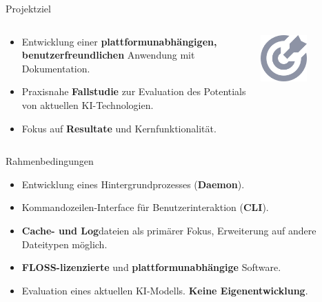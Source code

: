 \documentclass[
    ngerman,%
    authorontitle=true,
]{bfhbeamer}
\begin{document}
    \begin{frame}{Projektziel}
        \begin{columns}
            \begin{column}{0.7\textwidth}
                \begin{itemize}
                    \item Entwicklung einer \textbf{plattformunabh\"angigen, benutzerfreundlichen} Anwendung mit Dokumentation.
                    \item Praxisnahe \textbf{Fallstudie} zur Evaluation des Potentials von aktuellen KI-Technologien.
                    \item Fokus auf \textbf{Resultate} und Kernfunktionalit\"at.
                \end{itemize}
            \end{column}
            \begin{column}{0.3\textwidth}
                \begin{center}
                    \includegraphics[width=0.5\textwidth]{assets/presentation/target}
                \end{center}
            \end{column}
        \end{columns}
    \end{frame}

    \begin{frame}{Rahmenbedingungen}
        \begin{itemize}
            \item Entwicklung eines Hintergrundprozesses (\textbf{Daemon}).
            \item Kommandozeilen-Interface f\"ur Benutzerinteraktion (\textbf{CLI}).
            \item \textbf{Cache- und Log}dateien als prim\"arer Fokus, Erweiterung auf andere Dateitypen m\"oglich.
            \item \textbf{FLOSS-lizenzierte} und \textbf{plattformunabh\"angige} Software.
            \item Evaluation eines aktuellen KI-Modells. \textbf{Keine Eigenentwicklung}.
        \end{itemize}
    \end{frame}
\end{document}
